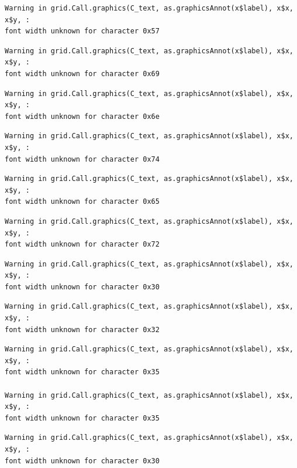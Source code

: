 \documentclass[
  letterpaper,
  DIV=11,
  numbers=noendperiod]{scrreprt}
\begin{document}
\begin{verbatim}
Warning in grid.Call.graphics(C_text, as.graphicsAnnot(x$label), x$x, x$y, :
font width unknown for character 0x57
\end{verbatim}

\begin{verbatim}
Warning in grid.Call.graphics(C_text, as.graphicsAnnot(x$label), x$x, x$y, :
font width unknown for character 0x69
\end{verbatim}

\begin{verbatim}
Warning in grid.Call.graphics(C_text, as.graphicsAnnot(x$label), x$x, x$y, :
font width unknown for character 0x6e
\end{verbatim}

\begin{verbatim}
Warning in grid.Call.graphics(C_text, as.graphicsAnnot(x$label), x$x, x$y, :
font width unknown for character 0x74
\end{verbatim}

\begin{verbatim}
Warning in grid.Call.graphics(C_text, as.graphicsAnnot(x$label), x$x, x$y, :
font width unknown for character 0x65
\end{verbatim}

\begin{verbatim}
Warning in grid.Call.graphics(C_text, as.graphicsAnnot(x$label), x$x, x$y, :
font width unknown for character 0x72
\end{verbatim}

\begin{verbatim}
Warning in grid.Call.graphics(C_text, as.graphicsAnnot(x$label), x$x, x$y, :
font width unknown for character 0x30
\end{verbatim}

\begin{verbatim}
Warning in grid.Call.graphics(C_text, as.graphicsAnnot(x$label), x$x, x$y, :
font width unknown for character 0x32
\end{verbatim}

\begin{verbatim}
Warning in grid.Call.graphics(C_text, as.graphicsAnnot(x$label), x$x, x$y, :
font width unknown for character 0x35

Warning in grid.Call.graphics(C_text, as.graphicsAnnot(x$label), x$x, x$y, :
font width unknown for character 0x35
\end{verbatim}

\begin{verbatim}
Warning in grid.Call.graphics(C_text, as.graphicsAnnot(x$label), x$x, x$y, :
font width unknown for character 0x30
\end{verbatim}
\end{document}
